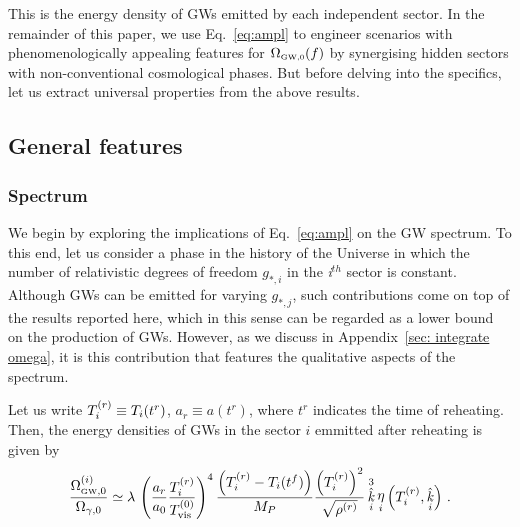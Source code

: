 \documentclass[a4paper,11pt]{article}
\DeclareMathOperator{\heta}{\eta}
\DeclareMathOperator{\hk}{\hat{\mathit{k}}}
\newcommand{\tem}[2]{T_{\tiny{#1}}^{(#2)}}
\newcommand{\lr}[1]{\left(#1\right)}
\begin{document}
This is the energy density of GWs emitted by each independent sector.
In the remainder of this paper,
we use Eq.~\eqref{eq:ampl} to engineer scenarios with phenomenologically appealing features for $\Omega_{\text{\tiny{GW},0}}(f)$ by synergising hidden sectors with non-conventional cosmological phases.
But before delving into the specifics,
let us extract universal properties from the above results.



\subsection{General features}\label{sec:generalresults}

\subsubsection{Spectrum}

We begin by exploring the implications of Eq.~\eqref{eq:ampl} on the GW spectrum.
To this end,
let us consider a phase in the history of the Universe in which the number of relativistic degrees of freedom $g_{*,i}$ in the \textit{i}$^{th}$ sector is constant. 
Although GWs can be emitted for varying $g_{*,j}$, such contributions come on top of the results reported here, which in this sense can be regarded as a lower bound on the production of GWs.
However, as we discuss in Appendix~\ref{sec: integrate omega}, it is this contribution that features the qualitative aspects of the spectrum.

Let us write $\tem{i}{r}\equiv T_i(t^{r})$, $a_{r}\equiv a(t^{r})$, where $t^r$ indicates the time of reheating. Then, the energy densities of GWs in the sector $i$ emmitted after reheating is given by
\begin{equation}\label{eq:OmegaSector}
\dfrac{\Omega^{(i)}_{\text{\tiny{GW}},0}}{ \Omega_{\gamma,0}}\simeq  \lambda\,  \left (\frac{a_{r}}{a_0}\frac{\tem{i}{r}}{\tem{\text{vis}}{0}}\right)^4
     \frac{\lr{\tem{i}{r}-T_i(t^f)}}{M_{P}} \dfrac{\left (\tem{i}{r}\right )^{2}}{\sqrt{\rho^{(r)}}}  \hk_i^3 \heta_i \left (\tem{i}{r}, \hk_i \right )  \,.
\end{equation}
\end{document}
